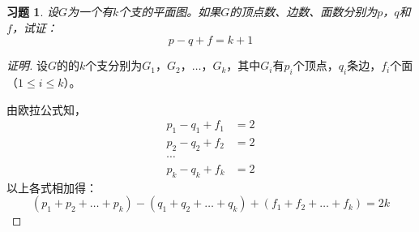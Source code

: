 \documentclass{article}
\begin{document}
\begin{CJK}{UTF8}{gbsn}
\newtheorem{Exercise}{习题}
\begin{Exercise}
    设$G$为一个有$k$个支的平面图。如果$G$的顶点数、边数、面数分别为$p$，$q$和$f$，试证：
  \[p-q+f=k+1\]
\end{Exercise}
\begin{proof}[证明]
    设$G$的的$k$个支分别为$G_1$，$G_2$，$\ldots$，$G_k$，其中$G_i$有$p_i$个顶点，$q_i$条边，$f_i$个面（$1\leq i \leq k$）。
  
    由欧拉公式知，
    \begin{align*}
      p_1-q_1+f_1&=2\\
      p_2-q_2+f_2&=2\\
      \cdots&\\
      p_k-q_k+f_k&=2
    \end{align*}
    以上各式相加得：
    \[(p_1+p_2+\ldots+p_k)-(q_1+q_2+\ldots+q_k)+(f_1+f_2+\ldots+f_k)=2k\]
  

\end{proof}
\end{CJK}
\end{document}

